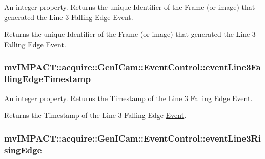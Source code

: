 An integer property. Returns the unique Identifier of the Frame (or image) that generated the Line 3 Falling Edge \hyperlink{classmv_i_m_p_a_c_t_1_1acquire_1_1_event}{Event}. 

Returns the unique Identifier of the Frame (or image) that generated the Line 3 Falling Edge \hyperlink{classmv_i_m_p_a_c_t_1_1acquire_1_1_event}{Event}. \hypertarget{classmv_i_m_p_a_c_t_1_1acquire_1_1_gen_i_cam_1_1_event_control_a892cc261ddcb2f6d568f066ebe76e024}{
\subsubsection[{event\+Line3\+Falling\+Edge\+Timestamp}]{ mv\+I\+M\+P\+A\+C\+T\+::acquire\+::\+Gen\+I\+Cam\+::\+Event\+Control\+::event\+Line3\+Falling\+Edge\+Timestamp}}\label{classmv_i_m_p_a_c_t_1_1acquire_1_1_gen_i_cam_1_1_event_control_a892cc261ddcb2f6d568f066ebe76e024}


An integer property. Returns the Timestamp of the Line 3 Falling Edge \hyperlink{classmv_i_m_p_a_c_t_1_1acquire_1_1_event}{Event}. 

Returns the Timestamp of the Line 3 Falling Edge \hyperlink{classmv_i_m_p_a_c_t_1_1acquire_1_1_event}{Event}. \hypertarget{classmv_i_m_p_a_c_t_1_1acquire_1_1_gen_i_cam_1_1_event_control_a86db5460242e14cafc909ed328f6f234}{
\subsubsection[{event\+Line3\+Rising\+Edge}]{ mv\+I\+M\+P\+A\+C\+T\+::acquire\+::\+Gen\+I\+Cam\+::\+Event\+Control\+::event\+Line3\+Rising\+Edge}}\label{classmv_i_m_p_a_c_t_1_1acquire_1_1_gen_i_cam_1_1_event_control_a86db5460242e14cafc909ed328f6f234}


